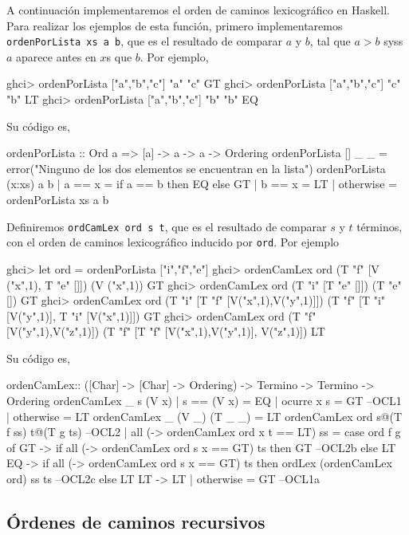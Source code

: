 
A continuación implementaremos el orden de caminos lexicográfico en
Haskell. Para realizar los ejemplos de esta función, primero
implementaremos \texttt{ordenPorLista xs a b}, que es el resultado de
comparar $a$ y $b$, tal que $a > b$ syss $a$ aparece antes en $x$s que
$b$. Por ejemplo,

\begin{sesion}
ghci> ordenPorLista ["a","b","c"] "a" "c"
GT
ghci> ordenPorLista ["a","b","c"] "c" "b"
LT
ghci> ordenPorLista ["a","b","c"] "b" "b"
EQ
\end{sesion}

Su código es,

\begin{codigo}
ordenPorLista :: Ord a => [a] -> a  -> a -> Ordering
ordenPorLista [] _ _ =
  error("Ninguno de los dos elementos se encuentran
         en la lista")
ordenPorLista (x:xs) a b
  | a == x = if a == b
             then EQ
             else GT
  | b == x = LT
  | otherwise = ordenPorLista xs a b
\end{codigo}

Definiremos \texttt{ordCamLex ord s t}, que es el resultado de
comparar $s$ y $t$ términos, con el orden de caminos lexicográfico
inducido por \texttt{ord}. Por ejemplo

\begin{sesion}
ghci> let ord = ordenPorLista ["i","f","e"]
ghci> ordenCamLex ord (T "f" [V ("x",1), T "e" []]) (V ("x",1))
GT
ghci> ordenCamLex ord (T "i" [T "e" []]) (T "e" [])
GT
ghci> ordenCamLex ord (T "i" [T "f" [V("x",1),V("y",1)]])
                      (T "f" [T "i" [V("y",1)], T "i" [V("x",1)]])
GT
ghci> ordenCamLex ord (T "f" [V("y",1),V("z",1)])
                      (T "f" [T "f" [V("x",1),V("y",1)], V("z",1)])
LT
\end{sesion}

Su código es,

\begin{codigo}
 ordenCamLex:: ([Char] -> [Char] -> Ordering)
                -> Termino -> Termino -> Ordering
ordenCamLex _ s (V x)
  | s == (V x) = EQ
  | ocurre x s = GT --OCL1
  | otherwise = LT
ordenCamLex _ (V _) (T _ _) = LT
ordenCamLex ord s@(T f ss) t@(T g ts) --OCL2
  | all (\x -> ordenCamLex ord x t == LT) ss
    = case ord f g of
      GT -> if all (\x -> ordenCamLex ord s x == GT) ts
            then GT --OCL2b
            else LT
      EQ -> if all (\x -> ordenCamLex ord s x == GT) ts
            then ordLex (ordenCamLex ord) ss ts --OCL2c
            else LT
      LT -> LT  
  | otherwise = GT --OCL1a
\end{codigo}

\subsection{Órdenes de caminos recursivos}



\clearpage
\addappheadtotoc
\appendix


